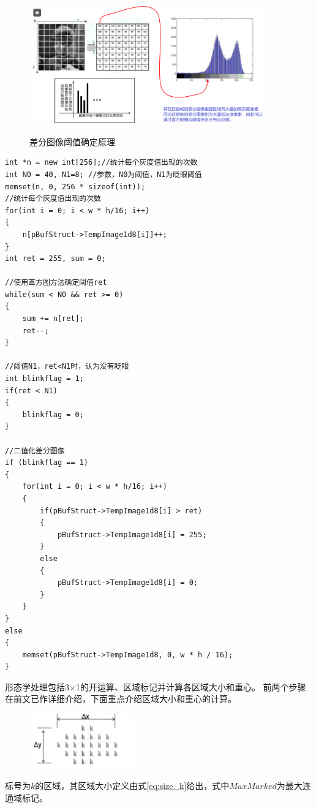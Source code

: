\documentclass[12pt,hyperref,a4paper,UTF8]{ctexart}
\begin{document}
\begin{figure}[H]
    \centering
    \caption{差分图像阈值确定原理}
    \includegraphics[width=0.9\textwidth]{./figures/fig/image7.png}
    \label{fig:your_image_label}
\end{figure}


        \begin{lstlisting}[caption={确定阈值，二值化差分图像}, label={lst:example}]
int *n = new int[256];//统计每个灰度值出现的次数
int N0 = 40, N1=8; //参数，N0为阈值，N1为眨眼阈值
memset(n, 0, 256 * sizeof(int)); 
//统计每个灰度值出现的次数
for(int i = 0; i < w * h/16; i++)
{
    n[pBufStruct->TempImage1d8[i]]++;
}
int ret = 255, sum = 0;

//使用直方图方法确定阈值ret
while(sum < N0 && ret >= 0)
{
    sum += n[ret];
    ret--;
}

//阈值N1，ret<N1时，认为没有眨眼
int blinkflag = 1;
if(ret < N1)
{
    blinkflag = 0;
}

//二值化差分图像
if (blinkflag == 1)
{
    for(int i = 0; i < w * h/16; i++)
    {
        if(pBufStruct->TempImage1d8[i] > ret)
        {
            pBufStruct->TempImage1d8[i] = 255;
        }
        else
        {
            pBufStruct->TempImage1d8[i] = 0;
        }
    }
}
else
{
    memset(pBufStruct->TempImage1d8, 0, w * h / 16);
}
        \end{lstlisting}



形态学处理包括3×1的开运算、区域标记并计算各区域大小和重心。
前两个步骤在前文已作详细介绍，下面重点介绍区域大小和重心的计算。
\begin{figure}[H]
    \centering
    \includegraphics[width=0.4\textwidth]{./figures/fig/image8.png}
    \label{fig:your_image_label}
\end{figure}
标号为$k$的区域，其区域大小定义由式\eqref{eq:size_k}给出，式中$MaxMarked$为最大连通域标记。
\end{document}
